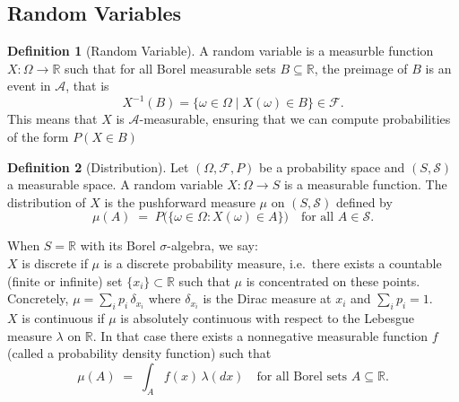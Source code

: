 \documentclass{article}
\theoremstyle{definition}
\newtheorem{definition}{Definition}[section]
\theoremstyle{remark}
\begin{document}
\subsection{Random Variables}



\begin{definition}[Random Variable] \label{def: Random_Variable}
A random variable is a measurble function $ X: \Omega \to \mathbb{R}$ such that for all Borel measurable sets $ B \subseteq \mathbb{R}$,
the preimage of $B$ is an event in $\mathcal{A}$, that is 
\[
X^{-1}(B) = \{ \omega \in \Omega \mid X(\omega) \in B \} \in \mathcal{F}.
\]
This means that $X$ is $\mathcal{A}$-measurable, ensuring that we can compute probabilities of the form $P(X \in B)$
\end{definition}





\begin{definition}[Distribution]\label{def:distribution}
Let \((\Omega,\mathcal{F},P)\) be a probability space and \((S,\mathcal{S})\) a measurable space. A random variable \(X:\Omega\to S\) is a measurable function. The distribution of \(X\) is the pushforward measure \(\mu\) on \((S,\mathcal{S})\) defined by
\[
\mu(A)\;=\;P\bigl(\{\omega\in\Omega : X(\omega)\in A\}\bigr)
\quad\text{for all }A\in \mathcal{S}.
\]

When \(S=\mathbb{R}\) with its Borel \(\sigma\)-algebra, we say:\\
\(X\) is discrete if \(\mu\) is a discrete probability measure, i.e.\ there exists a countable (finite or infinite) set \(\{x_i\}\subset \mathbb{R}\) such that \(\mu\) is concentrated on these points. Concretely, \(\mu=\sum_i p_i\,\delta_{x_i}\) where \(\delta_{x_i}\) is the Dirac measure at \(x_i\) and \(\sum_i p_i=1\).\\
\(X\) is continuous if \(\mu\) is absolutely continuous with respect to the Lebesgue measure \(\lambda\) on \(\mathbb{R}\). In that case there exists a nonnegative measurable function \(f\) (called a probability density function) such that 
\[
\mu(A) \;=\;\int_A f(x)\,\lambda(dx)
\quad\text{for all Borel sets }A\subseteq \mathbb{R}.
\]
\end{definition}    
\end{document}
